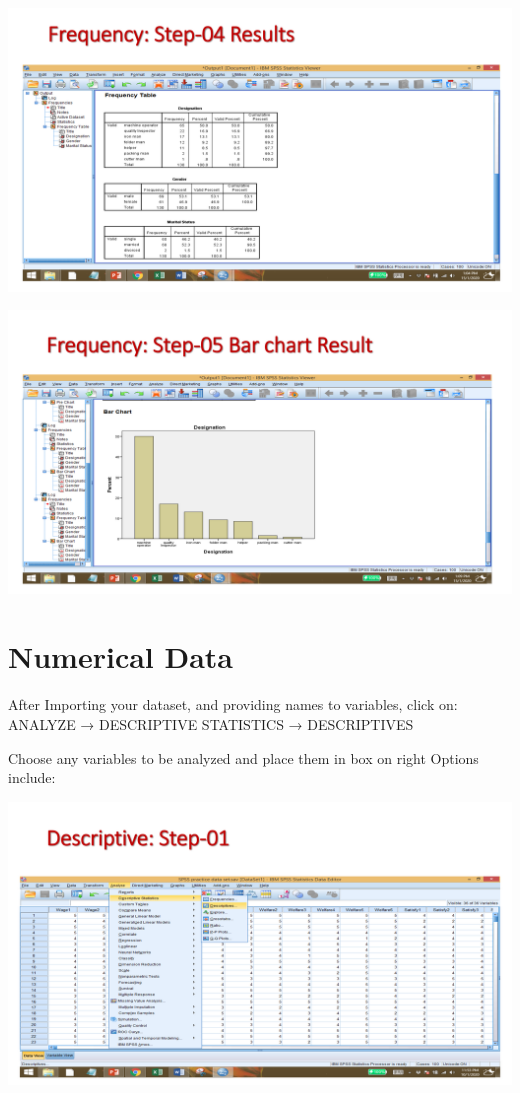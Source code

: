\documentclass[
  letterpaper,
  DIV=11,
  numbers=noendperiod]{scrreprt}
\begin{document}
\includegraphics{images/slides/img_Page_029.png}

\includegraphics{images/slides/img_Page_030.png}

\section{Numerical Data}\label{numerical-data}

After Importing your dataset, and providing names to variables, click
on:\\

{ANALYZE → DESCRIPTIVE STATISTICS → DESCRIPTIVES}

Choose any variables to be analyzed and place them in box on right
Options include:

\includegraphics{images/slides/img_Page_032.png}
\end{document}
